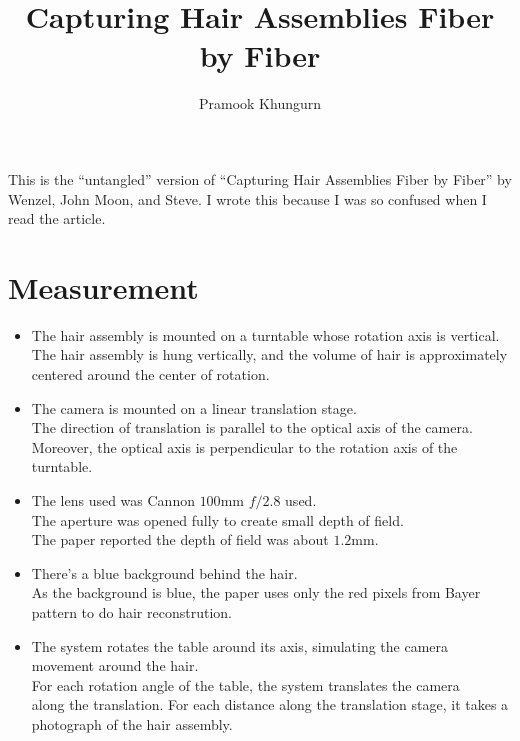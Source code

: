 \documentclass[10pt]{article}
\title{Capturing Hair Assemblies Fiber by Fiber}
\author{Pramook Khungurn}
\begin{document}
	\maketitle	
	
	This is the ``untangled'' version of ``Capturing Hair Assemblies Fiber by Fiber'' by Wenzel, John Moon, and Steve. I wrote this because I was so confused when I read the article. 
	
	\section{Measurement}
	
	\begin{itemize}
	  \item The hair assembly is mounted on a turntable whose rotation axis is vertical.\\
	  The hair assembly is hung vertically, and the volume of hair is approximately centered around the center of rotation.
	 
	  \item The camera is mounted on a linear translation stage.\\ 
	  The direction of translation is parallel to the optical axis of the camera.\\
	  Moreover, the optical axis is perpendicular to the rotation axis of the turntable.
	 
	  \item The lens used was Cannon $100\mathrm{mm}$ $f/2.8$ used.\\
	  The aperture was opened fully to create small depth of field.\\
	  The paper reported the depth of field was about $1.2\mathrm{mm}$.
	  
	  \item There's a blue background behind the hair.\\
	  As the background is blue, the paper uses only the red pixels from Bayer pattern to do hair reconstrution.
	  
	  \item The system rotates the table around its axis, simulating the camera movement around the hair.\\
	  For each rotation angle of the table, the system translates the camera\\ along the translation. For each distance along the translation stage, it takes a photograph of the hair assembly.
	\end{itemize}
	
\end{document}
